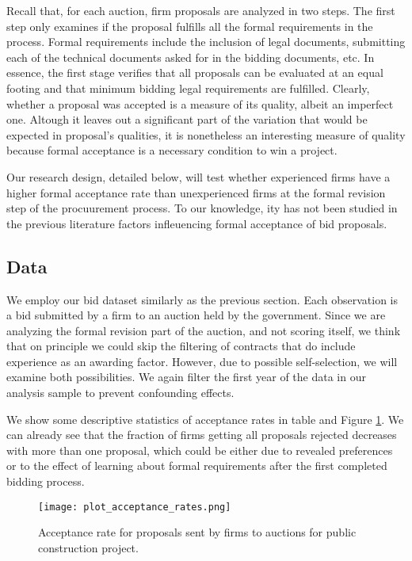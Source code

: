 Recall that, for each auction, firm proposals are analyzed in two steps. The first step only examines if the proposal fulfills all the formal requirements in the process. Formal requirements include the inclusion of legal documents, submitting each of the technical documents asked for in the bidding documents, etc. In essence, the first stage verifies that all proposals can be evaluated at an equal footing and that minimum bidding legal requirements are fulfilled. Clearly, whether a proposal was accepted is a measure of its quality, albeit an imperfect one. Altough it leaves out a significant part of the variation that would be expected in proposal's qualities, it is nonetheless an interesting measure of quality because formal acceptance is a necessary condition to win a project.

Our research design, detailed below, will test whether experienced firms have a higher formal acceptance rate than unexperienced firms at the formal revision step of the procuurement process. To our knowledge, ity has not been studied in the previous literature factors infleuencing formal acceptance of bid proposals.

\subsection{Data}
We employ our bid dataset similarly as the previous section. Each observation is a bid submitted by a firm to an auction held by the government. Since we are analyzing the formal revision part of the auction, and not scoring itself, we think that on principle we could skip the filtering of contracts that do include experience as an awarding factor. However, due to possible self-selection, we will examine both possibilities. We again filter the first year of the data in our analysis sample to prevent confounding effects.

We show some descriptive statistics of acceptance rates in table and Figure \ref{fig:plot_acceptance_rates}. We can already see that the fraction of firms getting all proposals rejected decreases with more than one proposal, which could be either due to revealed preferences or to the effect of learning about formal requirements after the first completed bidding process.

\begin{figure}
  \texttt{[image: plot\_acceptance\_rates.png]}
  \caption{Acceptance rate for proposals sent by firms to auctions for public construction project.}
  \label{fig:plot_acceptance_rates}
\end{figure}

